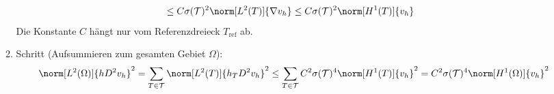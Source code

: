 \begin{solution}
\begin{enumerate}[label = \textbf{\alph*)}]
\begin{enumerate}[label = \arabic*.]
\begin{align*}
      & \leq
      C \sigma(\mathcal{T})^2 \norm[L^2(T)]{\nabla v_h}
      \leq
      C \sigma(\mathcal{T})^2 \norm[H^1(T)]{v_h}
    \end{align*}
    Die Konstante $C$ hängt nur vom Referenzdreieck $T_\mathrm{ref}$ ab.
    \item Schritt (Aufsummieren zum gesamten Gebiet $\Omega$):
    \begin{align*}
      \norm[L^2(\Omega)]{h D^2 v_h}^2
      =
      \sum_{T \in \mathcal{T}}
      \norm[L^2(T)]{h_T D^2 v_h}^2
      \leq
      \sum_{T \in \mathcal{T}}
      C^2 \sigma(\mathcal{T})^4 \norm[H^1(T)]{v_h}^2
      =
      C^2 \sigma(\mathcal{T})^4 \norm[H^1(\Omega)]{v_h}^2
    \end{align*}
  \end{enumerate}
\end{enumerate}
\end{solution}

